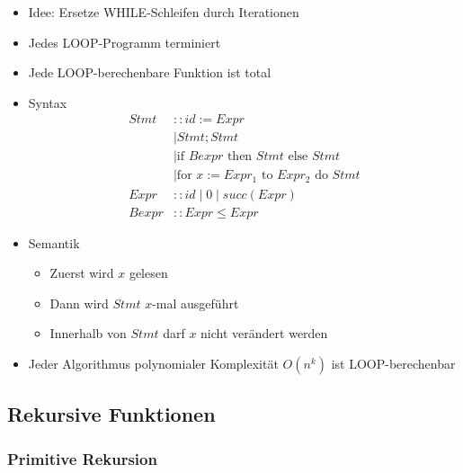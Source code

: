 \documentclass{scrartcl}
\begin{document}
\begin{itemize}
	\item Idee: Ersetze WHILE-Schleifen durch Iterationen
	\item Jedes LOOP-Programm terminiert
	\item Jede LOOP-berechenbare Funktion ist total
	\item Syntax
	\begin{align*}
		Stmt & :: id := Expr \\
		& \mid Stmt ; Stmt \\
		& \mid \text{if } Bexpr \text{ then } Stmt \text{ else } Stmt \\
		& \mid \text{for } x := Expr_1 \text{ to } Expr_2 \text{ do } Stmt \\
		Expr & :: id \mid 0 \mid succ(Expr) \\
		Bexpr & :: Expr \leq Expr
	\end{align*}
	\item Semantik
	\begin{itemize}
		\item Zuerst wird $x$ gelesen
		\item Dann wird $Stmt$ $x$-mal ausgeführt
		\item Innerhalb von $Stmt$ darf $x$ nicht verändert werden
	\end{itemize}
	\item Jeder Algorithmus polynomialer Komplexität $O(n^k)$ ist LOOP-berechenbar
\end{itemize}

\subsection{Rekursive Funktionen}

\subsubsection{Primitive Rekursion}
\end{document}
